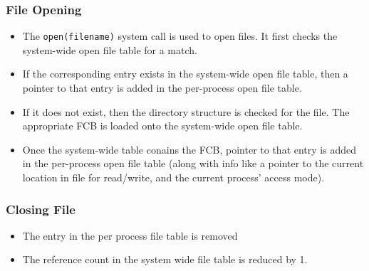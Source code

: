 \documentclass{article}
\theoremstyle{plain}
\theoremstyle{definition}
\begin{document}
\subsubsection{File Opening}
\begin{itemize}
    \item The \texttt{open(filename)} system call is used to open files. It first checks the system-wide open file table for a match. 
    
    \item If the corresponding entry exists in the system-wide open file table, then a pointer to that entry is added in the per-process open file table.
    
    \item If it does not exist, then the directory structure is checked for the file. The appropriate FCB is loaded onto the system-wide open file table. 
    
    \item Once the system-wide table conains the FCB, pointer to that entry is added in the per-process open file table (along with info like a pointer to the current location in file for read/write, and the current process' access mode). 
\end{itemize}

\subsubsection{Closing File}
\begin{itemize}
    \item The entry in the per process file table is removed
    
    \item The reference count in the system wide file table is reduced by 1.
\end{itemize}
\end{document}

